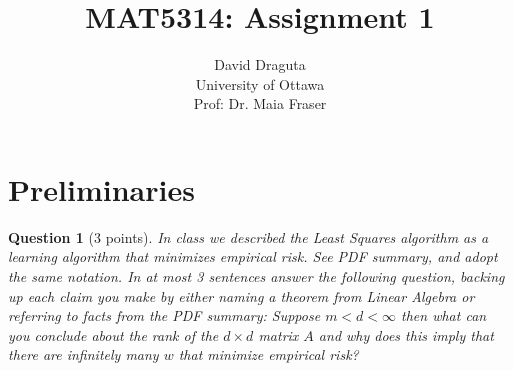 \documentclass[12pt]{article}
\newtheorem{question}{Question}
\begin{document}
\title{MAT5314: Assignment 1}
\author{David Draguta
  \\University of Ottawa\\ Prof: Dr. Maia Fraser } 
 
\maketitle
\section{Preliminaries}
\begin{question}[3 points]
  In class we described the Least Squares algorithm as a learning algorithm that minimizes empirical risk.
  See PDF summary, and adopt the same notation. In at most 3 sentences answer the following question, backing up each claim you make by either naming a theorem from Linear Algebra or referring to facts from the PDF summary: Suppose $m < d < \infty$ then what can you conclude about the rank of the $d \times d$ matrix $A$ and why does this imply that there are infinitely many $w$ that minimize empirical risk? 
\end{question}
\end{document}
